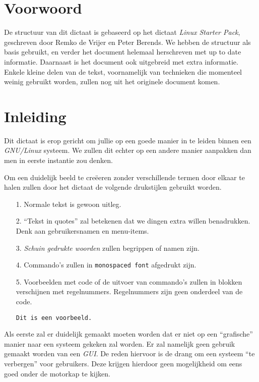 \documentclass[a4paper,11pt]{report}
\begin{document}
\chapter*{Voorwoord}
De structuur van dit dictaat is gebaseerd op het dictaat \textsl{Linux Starter Pack}\cite{bib.rvrijpb}, geschreven door Remko de Vrijer en Peter Berends. We hebben de structuur als basis gebruikt, en verder het document helemaal herschreven met up to date informatie. Daarnaast is het document ook uitgebreid met extra informatie. Enkele kleine delen van de tekst, voornamelijk van technieken die momenteel weinig gebruikt worden, zullen nog uit het originele document komen. 

\tableofcontents
{}

\chapter*{Inleiding}
Dit dictaat is erop gericht om jullie op een goede manier in te leiden binnen een \emph{GNU/Linux} systeem. We zullen dit echter op een andere manier aanpakken dan men in eerste instantie zou denken. 

Om een duidelijk beeld te cre\"{e}eren zonder verschillende termen door elkaar te halen zullen door het dictaat de volgende drukstijlen gebruikt worden. 
\begin{itemize}
\item[1.] Normale tekst is gewoon uitleg.
\item[2.] ``Tekst in quotes'' zal betekenen dat we dingen extra willen benadrukken. Denk aan gebruikersnamen en menu-items. 
\item[3.] \emph{Schuin gedrukte woorden} zullen begrippen of namen zijn.
\item[4.] Commando's zullen in \texttt{monospaced font} afgedrukt zijn. 
\item[5.] Voorbeelden met code of de uitvoer van commando's zullen in blokken verschijnen met regelnummers. Regelnummers zijn geen onderdeel van de code.
\begin{lstlisting}
Dit is een voorbeeld.
\end{lstlisting}
\end{itemize}
Als eerste zal er duidelijk gemaakt moeten worden dat er niet op een ``grafische'' manier naar een systeem gekeken zal worden. Er zal namelijk geen gebruik gemaakt worden van een \emph{GUI}. De reden hiervoor is de drang om een systeem ``te verbergen'' voor gebruikers. Deze krijgen hierdoor geen mogelijkheid om eens goed onder de motorkap te kijken. 
\end{document}
